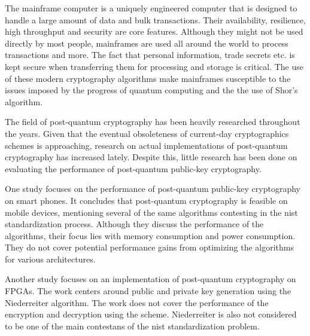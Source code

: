 The mainframe computer is a uniquely engineered computer that is designed to handle a large amount of data and bulk transactions. Their availability, resilience, high throughput and security are core features. Although they might not be used directly by most people, mainframes are used all around the world to process transactions and more. The fact that personal information, trade secrets etc. is kept secure when transferring them for processing and storage is critical. The use of these modern cryptography algorithms make mainframes susceptible to the issues imposed by the progress of quantum computing and the the use of Shor's algorithm.

The field of post-quantum cryptography has been heavily researched throughout the years. Given that the eventual obsoleteness of current-day cryptographics schemes is approaching, research on actual implementations of post-quantum cryptography has increased lately. Despite this, little research has been done on evaluating the performance of post-quantum public-key cryptography.

One study focuses on the performance of post-quantum public-key cryptography on smart phones. It concludes that post-quantum cryptography is feasible on mobile devices, mentioning several of the same algorithms contesting in the \gls{nist} standardization process. Although they discuss the performance of the algorithms, their focus lies with memory consumption and power consumption. They do not cover potential performance gains from optimizing the algorithms for various architectures.%

Another study focuses on an implementation of post-quantum cryptography on FPGAs. The work centers around public and private key generation using the Niederreiter algorithm. The work does not cover the performance of the encryption and decryption using the scheme. Niederreiter is also not considered to be one of the main contestans of the \gls{nist} standardization problem.%

